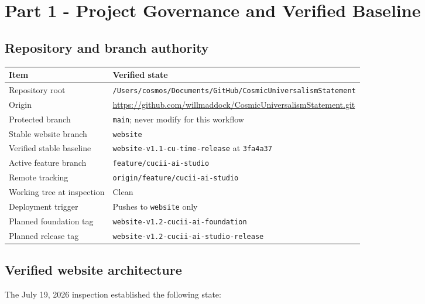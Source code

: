 \documentclass[11pt,letterpaper]{article}
\newcommand{\RepositoryURL}{https://github.com/willmaddock/CosmicUniversalismStatement}
\newcommand{\branchname}[1]{\texttt{#1}}
\begin{document}
\section{Part 1 - Project Governance and Verified Baseline}

\subsection{Repository and branch authority}

\begin{tabularx}{\textwidth}{L{2.15in}Y}
\toprule
\textbf{Item} & \textbf{Verified state} \\
\midrule
Repository root & \nolinkurl{/Users/cosmos/Documents/GitHub/CosmicUniversalismStatement} \\
Origin & \href{\RepositoryURL}{\RepositoryURL.git} \\
Protected branch & \branchname{main}; never modify for this workflow \\
Stable website branch & \branchname{website} \\
Verified stable baseline & \branchname{website-v1.1-cu-time-release} at \texttt{3fa4a37} \\
Active feature branch & \branchname{feature/cucii-ai-studio} \\
Remote tracking & \texttt{origin/feature/cucii-ai-studio} \\
Working tree at inspection & Clean \\
Deployment trigger & Pushes to \branchname{website} only \\
Planned foundation tag & \branchname{website-v1.2-cucii-ai-foundation} \\
Planned release tag & \branchname{website-v1.2-cucii-ai-studio-release} \\
\bottomrule
\end{tabularx}

\subsection{Verified website architecture}

The July 19, 2026 inspection established the following state:
\end{document}

